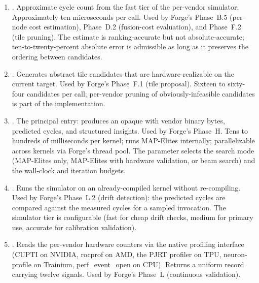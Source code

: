 \begin{enumerate}
  \item {}.
        Approximate cycle count from the fast tier of the per-vendor simulator.
        Approximately ten microseconds per call.
        Used by Forge's Phase~B.5 (per-node cost estimation), Phase~D.2 (fusion-cost evaluation), and Phase~F.2 (tile pruning).
        The estimate is ranking-accurate but not absolute-accurate; ten-to-twenty-percent absolute error is admissible as long as it preserves the ordering between candidates.

  \item {}.
        Generates abstract tile candidates that are hardware-realizable on the current target.
        Used by Forge's Phase~F.1 (tile proposal).
        Sixteen to sixty-four candidates per call; per-vendor pruning of obviously-infeasible candidates is part of the implementation.

  \item {}.
        The principal entry: produces an opaque  with vendor binary bytes, predicted cycles, and structured insights.
        Used by Forge's Phase~H.
        Tens to hundreds of milliseconds per kernel; runs MAP-Elites internally; parallelizable across kernels via Forge's thread pool.
        The  parameter selects the search mode (MAP-Elites only, MAP-Elites with hardware validation, or beam search) and the wall-clock and iteration budgets.

  \item {}.
        Runs the simulator on an already-compiled kernel without re-compiling.
        Used by Forge's Phase~L.2 (drift detection): the predicted cycles are compared against the measured cycles for a sampled invocation.
        The simulator tier is configurable (fast for cheap drift checks, medium for primary use, accurate for calibration validation).

  \item {}.
        Reads the per-vendor hardware counters via the native profiling interface (CUPTI on NVIDIA, rocprof on AMD, the PJRT profiler on TPU, neuron-profile on Trainium, perf\_event\_open on CPU).
        Returns a uniform  record carrying twelve signals.
        Used by Forge's Phase~L (continuous validation).
\end{enumerate}

